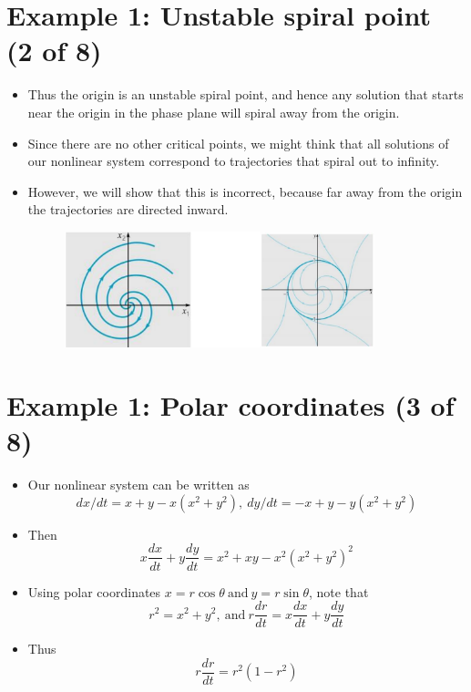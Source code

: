 \documentclass[11pt,a4paper]{article}
\begin{document}
	\section*{Example 1: Unstable spiral point (2 of 8)}
	\begin{itemize}
		\item Thus the origin is an unstable spiral point, and hence any solution that starts near the origin in the phase plane will spiral away from the origin.
		\item Since there are no other critical points, we might think that all solutions of our nonlinear system correspond to trajectories that spiral out to infinity.
		\item However, we will show that this is incorrect, because far away from the origin the trajectories are directed inward.
		\begin{figure}[H]
			\centering
			\includegraphics[width=0.85\textwidth]{figure/Lec19f3.PNG}
		\end{figure}
	\end{itemize}
	\section*{Example 1: Polar coordinates (3 of 8)}
	\begin{itemize}
		\item Our nonlinear system can be written as
		$$
		dx/dt = x+y-x(x^2+y^2),\ dy/dt = -x+y-y(x^2+y^2)
		$$
		\item Then
		$$
		x\frac{dx}{dt} + y\frac{dy}{dt} = x^2 + xy - x^2(x^2+y^2)^2
		$$
		\item Using polar coordinates $x = r \cos\theta\ \text{and}\ y = r\sin\theta $, note that
		$$
		r^2 = x^2+y^2,\ \text{and}\ r\frac{dr}{dt} = x\frac{dx}{dt} + y\frac{dy}{dt}
		$$
		\item Thus
		$$
		r\frac{dr}{dt} = r^2(1-r^2)
		$$
	\end{itemize}
\end{document}
